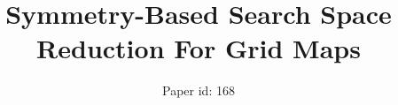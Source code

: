 \documentclass{article}
\begin{document}
\title{Symmetry-Based Search Space Reduction For Grid Maps}
\author{
Paper id: 168
}

\maketitle










%



\end{document}
